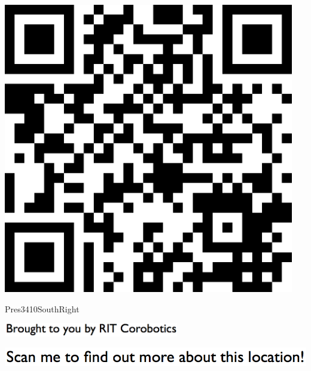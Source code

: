 \documentclass[letterpaper]{article}
\begin{document}
 \begingroup 
 \centerline{\includegraphics[scale=1,width=5in,height=5in]{Pres3410SouthRight.png}} 
 \endgroup 
 \vspace*{\fill} 

 \hfill{\small Pres3410SouthRight} 

  \vspace{0.7in} 
 
 \centerline{\includegraphics[scale=1,width=3in]{text-bottom.png}} 
 
 \pagebreak 
{} 
 \vspace*{\fill} 
 
  \centerline{\includegraphics[scale=1,width=6in]{text-top.png}} 
 
 \vspace{0.5in} 
 
\end{document}
